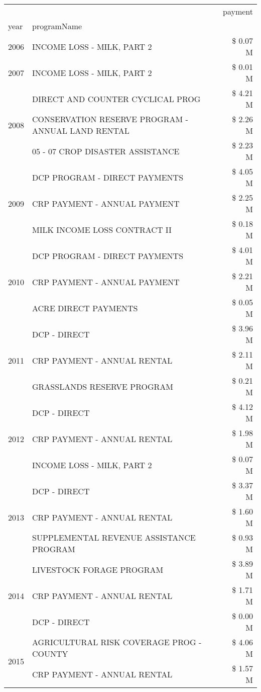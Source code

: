 \begin{tabular}{llr}
\toprule
 &  & payment \\
year & programName &  \\
\midrule
2006 & INCOME LOSS - MILK, PART 2 & \$ 0.07 M \\
\cline{1-3}
2007 & INCOME LOSS - MILK, PART 2 & \$ 0.01 M \\
\cline{1-3}
\multirow[t]{3}{*}{2008} & DIRECT AND COUNTER CYCLICAL PROG & \$ 4.21 M \\
 & CONSERVATION RESERVE PROGRAM - ANNUAL LAND RENTAL & \$ 2.26 M \\
 & 05 - 07 CROP DISASTER ASSISTANCE & \$ 2.23 M \\
\cline{1-3}
\multirow[t]{3}{*}{2009} & DCP PROGRAM - DIRECT PAYMENTS & \$ 4.05 M \\
 & CRP PAYMENT - ANNUAL PAYMENT & \$ 2.25 M \\
 & MILK INCOME LOSS CONTRACT II & \$ 0.18 M \\
\cline{1-3}
\multirow[t]{3}{*}{2010} & DCP PROGRAM - DIRECT PAYMENTS & \$ 4.01 M \\
 & CRP PAYMENT - ANNUAL PAYMENT & \$ 2.21 M \\
 & ACRE DIRECT PAYMENTS & \$ 0.05 M \\
\cline{1-3}
\multirow[t]{3}{*}{2011} & DCP - DIRECT & \$ 3.96 M \\
 & CRP PAYMENT - ANNUAL RENTAL & \$ 2.11 M \\
 & GRASSLANDS RESERVE PROGRAM & \$ 0.21 M \\
\cline{1-3}
\multirow[t]{3}{*}{2012} & DCP - DIRECT & \$ 4.12 M \\
 & CRP PAYMENT - ANNUAL RENTAL & \$ 1.98 M \\
 & INCOME LOSS - MILK, PART 2 & \$ 0.07 M \\
\cline{1-3}
\multirow[t]{3}{*}{2013} & DCP - DIRECT & \$ 3.37 M \\
 & CRP PAYMENT - ANNUAL RENTAL & \$ 1.60 M \\
 & SUPPLEMENTAL REVENUE ASSISTANCE PROGRAM & \$ 0.93 M \\
\cline{1-3}
\multirow[t]{3}{*}{2014} & LIVESTOCK FORAGE PROGRAM & \$ 3.89 M \\
 & CRP PAYMENT - ANNUAL RENTAL & \$ 1.71 M \\
 & DCP - DIRECT & \$ 0.00 M \\
\cline{1-3}
\multirow[t]{3}{*}{2015} & AGRICULTURAL RISK COVERAGE PROG - COUNTY & \$ 4.06 M \\
 & CRP PAYMENT - ANNUAL RENTAL & \$ 1.57 M \\

\end{tabular}
